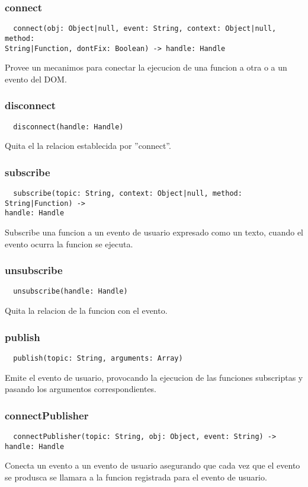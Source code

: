 \subsubsection*{connect}
\begin{verbatim}
  connect(obj: Object|null, event: String, context: Object|null, method:
String|Function, dontFix: Boolean) -> handle: Handle 
\end{verbatim}
Provee un mecanimos para conectar la ejecucion de una funcion a otra o a un
evento del DOM.  

\subsubsection*{disconnect}
\begin{verbatim}
  disconnect(handle: Handle)
\end{verbatim}
Quita el la relacion establecida por ''connect''.

\subsubsection*{subscribe}
\begin{verbatim}
  subscribe(topic: String, context: Object|null, method: String|Function) ->
handle: Handle
\end{verbatim}
Subscribe una funcion a un evento de usuario expresado como un texto, cuando el
evento ocurra la funcion se ejecuta.

\subsubsection*{unsubscribe}
\begin{verbatim}
  unsubscribe(handle: Handle)
\end{verbatim}
Quita la relacion de la funcion con el evento. 

\subsubsection*{publish}
\begin{verbatim}
  publish(topic: String, arguments: Array)
\end{verbatim}
Emite el evento de usuario, provocando la ejecucion de las funciones subscriptas
y pasando los argumentos correspondientes.

\subsubsection*{connectPublisher}
\begin{verbatim}
  connectPublisher(topic: String, obj: Object, event: String) -> handle: Handle
\end{verbatim}
Conecta un evento a un evento de usuario asegurando que cada vez que el evento
se produsca se llamara a la funcion registrada para el evento de usuario.

